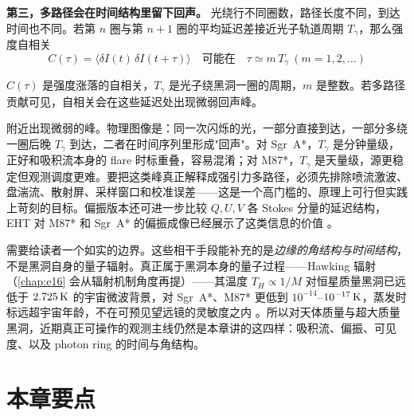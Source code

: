 \textbf{第三，多路径会在时间结构里留下回声。} 光绕行不同圈数，路径长度不同，到达时间也不同。若第 \(n\) 圈与第 \(n+1\) 圈的平均延迟差接近光子轨道周期 \(T_\gamma\)，那么强度自相关
\begin{equation}
  C(\tau)=\big\langle\delta I(t)\,\delta I(t+\tau)\big\rangle
  \quad\text{可能在}\quad
  \tau\simeq m\,T_\gamma\ (m=1,2,\dots)
  \label{eq:e19-echo}
\end{equation}
\begin{formulaexplain}
\(C(\tau)\) 是强度涨落的自相关，\(T_\gamma\) 是光子绕黑洞一圈的周期，\(m\) 是整数。若多路径贡献可见，自相关会在这些延迟处出现微弱回声峰。
\end{formulaexplain}
附近出现微弱的峰。物理图像是：同一次闪烁的光，一部分直接到达，一部分多绕一圈后晚 \(T_\gamma\) 到达，二者在时间序列里形成"回声"。对 Sgr~A*，\(T_\gamma\) 是分钟量级，正好和吸积流本身的 flare 时标重叠，容易混淆；对 M87*，\(T_\gamma\) 是天量级，源更稳定但观测调度更难。要把这类峰真正解释成强引力多路径，必须先排除喷流激波、盘湍流、散射屏、采样窗口和校准误差——这是一个高门槛的、原理上可行但实践上苛刻的目标。偏振版本还可进一步比较 \(Q,U,V\) 各 Stokes 分量的延迟结构，EHT 对 M87* 和 Sgr~A* 的偏振成像已经展示了这类信息的价值 \citep{2021ApJ...910L..13E,2021PhRvD.104d4049G,2022PhRvD.106d3021C}。

需要给读者一个如实的边界。这些相干手段能补充的是\emph{边缘的角结构与时间结构}，不是黑洞自身的量子辐射。真正属于黑洞本身的量子过程——Hawking 辐射（\ref{chap:e16} 会从辐射机制角度再提）——其温度 \(T_H\propto1/M\) 对恒星质量黑洞已远低于 \(2.725\,{\rm K}\) 的宇宙微波背景，对 Sgr~A*、M87* 更低到 \(10^{-14}\)–\(10^{-17}\,{\rm K}\)，蒸发时标远超宇宙年龄，不在可预见望远镜的灵敏度之内 \citep{1974Natur.248...30H,1975CMaPh..43..199H}。所以对天体质量与超大质量黑洞，近期真正可操作的观测主线仍然是本章讲的这四样：吸积流、偏振、可见度、以及 photon ring 的时间与角结构。

\section{本章要点}
\label{sec:e19-summary}

